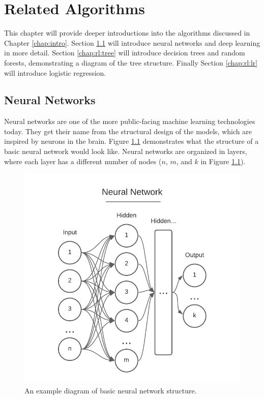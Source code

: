 \chapter{Related Algorithms} \label{chap:rl}


This chapter will provide deeper introductions into the algorithms discussed in Chapter \ref{chap:intro}.
Section \ref{chap:rl:nn} will introduce neural networks and deep learning in more detail.
Section \ref{chap:rl:tree} will introduce decision trees and random forests, demonstrating a diagram of the tree structure.
Finally Section \ref{chap:rl:lr} will introduce logistic regression.

\section{Neural Networks} \label{chap:rl:nn}

Neural networks are one of the more public-facing machine learning technologies today. They get their name from the structural design of the models, which are inspired by neurons in the brain. Figure \ref{fig:rl:nn} demonstrates what the structure of a basic neural network would look like. Neural networks are organized in layers, where each layer has a different number of nodes ($n$, $m$, and $k$ in Figure \ref{fig:rl:nn}).

\begin{figure}[ht]
    \centering
    \includegraphics[width=0.8 \textwidth]{Figures/Neural-Network.pdf}
    \caption{An example diagram of basic neural network structure.}
    \label{fig:rl:nn}
\end{figure}

